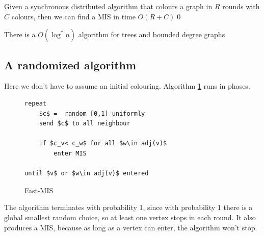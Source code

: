 \begin{thm} Given a synchronous distributed algorithm that colours a graph in $R$ rounds with $C$ colours, then we can find a MIS in time $O(R+C)$\qed\end{thm}

\begin{cor} There is a $O(\log^* n)$ algorithm for trees and bounded degree graphs\end{cor}

\subsection{A randomized algorithm}

Here we don't have to assume an initial colouring. Algorithm \ref{alg:fast_mis} runs in phases.

\begin{figure}
\begin{lstlisting}
repeat
	$c$ =  random [0,1] uniformly 
	send $c$ to all neighbour
	
	if $c_v< c_w$ for all $w\in adj(v)$ 
		enter MIS

until $v$ or $w\in adj(v)$ entered
\end{lstlisting}
\caption{Fast-MIS}
\label{alg:fast_mis}
\end{figure}

The algorithm terminates with probability 1, since with probability 1 there is a global smallest random choice, so at least one vertex stops in each round. It also produces a MIS, because as long as a vertex can enter, the algorithm won't stop.

